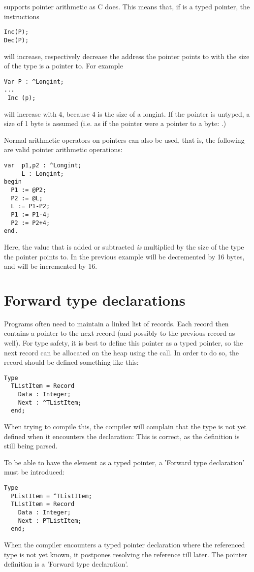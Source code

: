 \fpc supports pointer arithmetic as C does. This means that, if  is a
typed pointer, the instructions
\begin{verbatim}
Inc(P);
Dec(P);
\end{verbatim}
will increase, respectively decrease the address the pointer points to
with the size of the type  is a pointer to. For example
\begin{verbatim}
Var P : ^Longint;
...
 Inc (p);
\end{verbatim}
will increase  with 4, because 4 is the size of a longint. If the
pointer is untyped, a size of 1 byte is assumed (i.e. as if the pointer were
a pointer to a byte: .)

Normal arithmetic operators  on pointers can also be used, 
that is, the following are valid pointer arithmetic operations:
\begin{verbatim}
var  p1,p2 : ^Longint;
     L : Longint;
begin
  P1 := @P2;
  P2 := @L;
  L := P1-P2;
  P1 := P1-4;
  P2 := P2+4;
end.
\end{verbatim}
Here, the value that is added or subtracted {\em is } multiplied by the
size of the type the pointer points to. In the previous
example  will be decremented by 16 bytes, and 
 will be incremented by 16.

\section{Forward type declarations}
Programs often need to maintain a linked list of records. Each record then
contains a pointer to the next record (and possibly to the previous record
as well). For type safety, it is best to define this pointer as a typed
pointer, so the next record can be allocated on the heap using the 
call. In order to do so, the record should be defined something like this:
\begin{verbatim}
Type
  TListItem = Record
    Data : Integer;
    Next : ^TListItem;
  end;
\end{verbatim}  
When trying to compile this, the compiler will complain that the
 type is not yet defined when it encounters the 
declaration: This is correct, as the definition is still being parsed.

To be able to have the  element as a typed pointer, a 'Forward
type declaration' must be introduced:
\begin{verbatim}
Type
  PListItem = ^TListItem;
  TListItem = Record
    Data : Integer;
    Next : PTListItem;
  end;
\end{verbatim}  
When the compiler encounters a typed pointer declaration where the
referenced type is not yet known, it postpones resolving the reference till
later. The pointer definition is a 'Forward type declaration'. 

